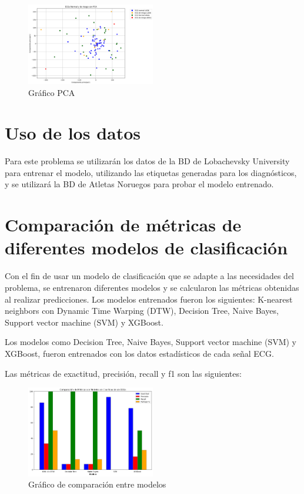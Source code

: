 \documentclass[conference]{IEEEtran}
\begin{document}
\begin{figure}[H]
    \includegraphics[width=0.5\textwidth]{./graficos/graficoPCA.png}
    \caption{Gráfico PCA}
\end{figure}

\section{Uso de los datos}
Para este problema se utilizarán los datos de la BD de Lobachevsky University para entrenar el modelo,
 utilizando las etiquetas generadas para los diagnósticos, y se utilizará la BD de Atletas Noruegos para
  probar el modelo entrenado. 

\section{Comparación de métricas de diferentes modelos de clasificación}
Con el fin de usar un modelo de clasificación que se adapte a las necesidades del problema, 
se entrenaron diferentes modelos y se calcularon las métricas obtenidas al realizar predicciones. 
Los modelos entrenados fueron los siguientes: K-nearest neighbors con Dynamic Time Warping (DTW), 
Decision Tree, Naive Bayes, Support vector machine (SVM) y XGBoost.

Los modelos como Decision Tree, Naive Bayes, Support vector machine (SVM) y XGBoost, fueron 
entrenados con los datos estadísticos de cada señal ECG.

Las métricas de exactitud, precisión, recall y f1 son las siguientes:

\begin{figure}[H]
    \includegraphics[width=0.5\textwidth]{./graficos/comparacionModelosClasificacion.png}
    \caption{Gráfico de comparación entre modelos}
\end{figure}
\end{document}
